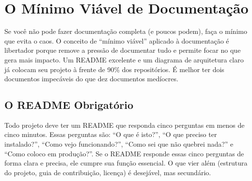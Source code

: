 \section{O Mínimo Viável de Documentação}

Se você não pode fazer documentação completa (e poucos podem), faça
o mínimo que evita o caos. O conceito de ``mínimo viável'' aplicado à
documentação é libertador porque remove a pressão de documentar tudo e
permite focar no que gera mais impacto. Um README excelente e um
diagrama de arquitetura claro já colocam seu projeto à frente de 90\%
dos repositórios. É melhor ter dois documentos impecáveis do que dez
documentos medíocres.


\subsection{O README Obrigatório}

Todo projeto deve ter um README que responda cinco perguntas em menos
de cinco minutos. Essas perguntas são: ``O que é isto?'', ``O que
preciso ter instalado?'', ``Como vejo funcionando?'', ``Como sei que
não quebrei nada?'' e ``Como coloco em produção?''. Se o README
responde essas cinco perguntas de forma clara e precisa, ele cumpre
sua função essencial. O que vier além (estrutura do projeto, guia
de contribuição, licença) é desejável, mas secundário.

